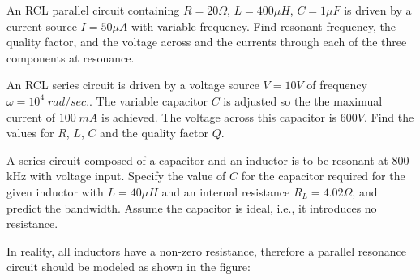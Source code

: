 \begin{enumerate}
\end{enumerate}


\item An RCL parallel circuit containing $R=20\Omega$, $L=400 \mu H$,
$C=1 \mu F$ is driven by a current source $I=50 \mu A$ with variable 
frequency. Find resonant frequency, the quality factor, and the voltage
across and the currents through each of the three components at resonance.

% 
 
 
\item An RCL series circuit is driven by a voltage source $V=10V$ of
frequency $\omega=10^4 \;rad/sec.$. The variable capacitor $C$ is
adjusted so the the maximual current of $100\;mA$ is achieved. The
voltage across this capacitor is $600V$. Find the values for $R$, $L$,
$C$ and the quality factor $Q$.

% 


\item A series circuit composed of a capacitor and an inductor is to be 
resonant at 800 kHz with voltage input. Specify the value of $C$ for the 
capacitor required for the given inductor with $L=40\mu H$ and an internal 
resistance $R_L=4.02\Omega$, and predict the bandwidth. Assume the capacitor 
is ideal, i.e., it introduces no resistance.



\item In reality, all inductors have a non-zero resistance, therefore a 
parallel resonance circuit should be modeled as shown in the figure:


